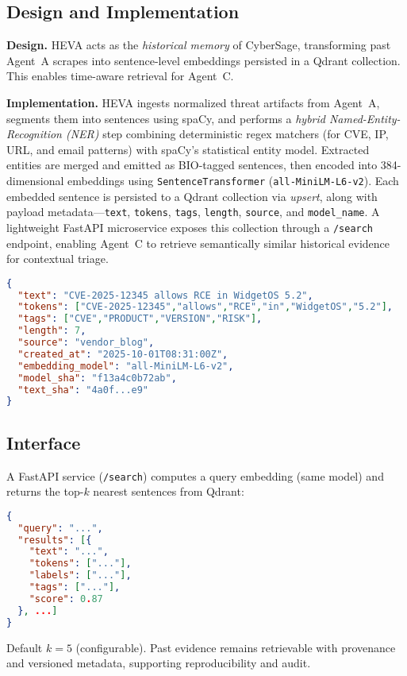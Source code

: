 \subsection{Design and Implementation}
\textbf{Design.}
HEVA acts as the \emph{historical memory} of CyberSage, transforming past Agent~A scrapes into sentence-level embeddings persisted in a Qdrant collection. This enables time-aware retrieval for Agent~C.

\textbf{Implementation.}
HEVA ingests normalized threat artifacts from Agent~A, segments them into sentences using spaCy, and performs a \emph{hybrid Named-Entity-Recognition (NER)} step combining deterministic regex matchers (for CVE, IP, URL, and email patterns) with spaCy’s statistical entity model.  
Extracted entities are merged and emitted as BIO-tagged sentences, then encoded into 384-dimensional embeddings using \texttt{SentenceTransformer} (\texttt{all-MiniLM-L6-v2}).  
Each embedded sentence is persisted to a Qdrant collection via \emph{upsert}, along with payload metadata—\texttt{text}, \texttt{tokens}, \texttt{tags}, \texttt{length}, \texttt{source}, and \texttt{model\_name}.  
A lightweight FastAPI microservice exposes this collection through a \texttt{/search} endpoint, enabling Agent~C to retrieve semantically similar historical evidence for contextual triage.

\begin{lstlisting}[language=json,caption={Qdrant Payload Schema for HEVA (Per Sentence)},label={lst:agentB-payload}]
{
  "text": "CVE-2025-12345 allows RCE in WidgetOS 5.2",
  "tokens": ["CVE-2025-12345","allows","RCE","in","WidgetOS","5.2"],
  "tags": ["CVE","PRODUCT","VERSION","RISK"],
  "length": 7,
  "source": "vendor_blog",
  "created_at": "2025-10-01T08:31:00Z",
  "embedding_model": "all-MiniLM-L6-v2",
  "model_sha": "f13a4c0b72ab",
  "text_sha": "4a0f...e9"
}
\end{lstlisting}

\subsection{Interface}
A FastAPI service (\texttt{/search}) computes a query embedding (same model) and returns the top-$k$ nearest sentences from Qdrant:
\begin{lstlisting}[language=json,caption={/search Response Schema}]
{
  "query": "...",
  "results": [{
    "text": "...",
    "tokens": ["..."],
    "labels": ["..."],
    "tags": ["..."],
    "score": 0.87
  }, ...]
}
\end{lstlisting}
Default $k=5$ (configurable).  
Past evidence remains retrievable with provenance and versioned metadata, supporting reproducibility and audit.

